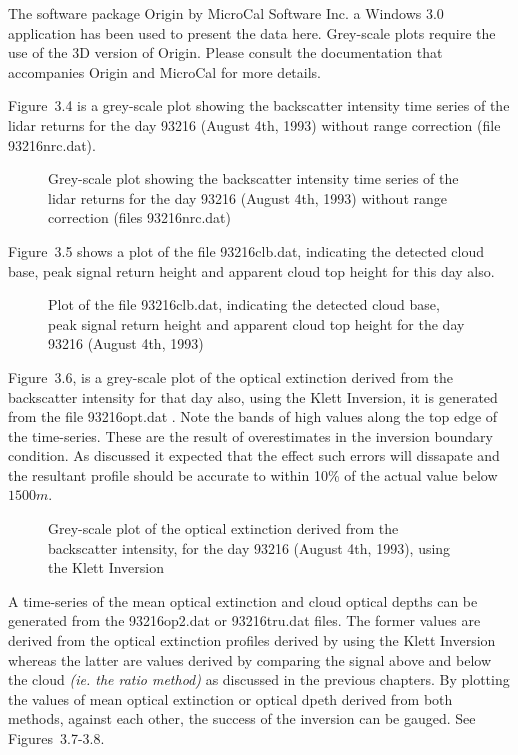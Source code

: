 The software  package Origin by MicroCal Software Inc. a Windows 3.0
application has been used to present the data here. 
Grey-scale plots require the use of the 3D version
of Origin. Please consult the documentation that accompanies
Origin and MicroCal for more details.

Figure~{3.4} is a grey-scale plot showing the backscatter
intensity time series of the lidar returns for the day 93216 (August 4th, 1993) 
without range correction (file 93216nrc.dat).

\begin{figure}
\vspace{5.0in}
\caption{Grey-scale plot showing the backscatter
intensity time series of the lidar returns for the day 93216 (August 4th, 1993) 
without range correction (files 93216nrc.dat)}
\end{figure}

Figure~{3.5} shows a plot of the file 93216clb.dat, indicating the
detected cloud base, peak signal return height and apparent cloud
top height for this day also.

\begin{figure}
\vspace{5.0in}
\caption{Plot of the file 93216clb.dat, indicating the
detected cloud base, peak signal return height and apparent cloud
top height for the day 93216 (August 4th, 1993)}
\end{figure}

Figure~{3.6}, is a grey-scale plot of the optical extinction derived
from the backscatter intensity for that day also, using the Klett
Inversion, it is generated from the file 93216opt.dat \cite{jdk1}.
Note the bands of high values along the top edge of the
time-series. These are the result of overestimates in the 
inversion boundary condition. As discussed it expected that 
the effect such errors will dissapate and the 
resultant profile should be accurate to within 10\% of 
the actual value below $1500 m$.

\begin{figure}
\vspace{5.0in}
\caption{Grey-scale plot of the optical extinction derived
from the backscatter intensity, for the day 93216 (August 4th, 1993), 
using the Klett Inversion}
\end{figure}

A time-series of the mean optical extinction and cloud optical depths
can be generated from the 93216op2.dat or 93216tru.dat files. The former
values are derived from the optical extinction profiles derived by using
the Klett Inversion \cite{jdk1} whereas 
the latter are values derived by comparing
the signal above and below the cloud {\em (ie. the ratio method)}
as discussed in the previous chapters.
By plotting the values of mean optical extinction or optical dpeth 
derived from both methods, against each other, the success of the
inversion can be gauged. See Figures~{3.7-3.8}.

